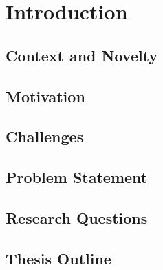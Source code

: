 
\chapter{Introduction}
\section{Context and Novelty}
\section{Motivation}
\section{Challenges}
\section{Problem Statement}
\section{Research Questions}
\section{Thesis Outline}